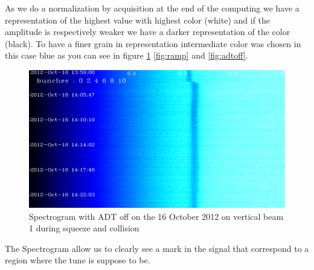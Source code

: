 As we do a normalization by acquisition at the end of the computing we have a representation of the highest value with highest color (white) and if the amplitude is respectively weaker we have a darker representation of the color (black). To have a finer grain in representation intermediate color was chosen in this case blue as you can see in figure \ref{fig:squeeze} \ref{fig:ramp} and \ref{fig:adtoff}.

\begin{figure}[H]
	\caption{Spectrogram with ADT off on the 16 October 2012 on vertical beam 1 during squeeze and collision}
	\label{fig:squeeze}
	\centering
	\includegraphics[scale=0.3]{md-121016-vb1-m1-6bunches-10acc-1359-1425-collision.pdf}
\end{figure}

The Spectrogram allow us to clearly see a mark in the signal that correspond to a region where the tune is suppose to be.